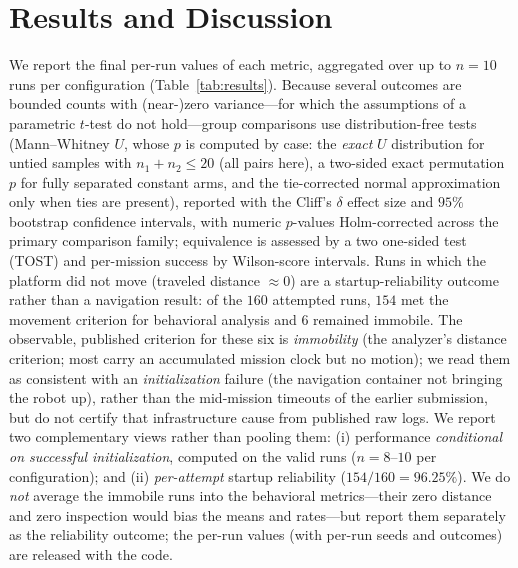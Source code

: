 \section{Results and Discussion}
\label{sec:results}
We report the final per-run values of each metric, aggregated over up to $n=10$
runs per configuration (Table~\ref{tab:results}). Because several outcomes are
bounded counts with (near-)zero variance---for which the assumptions of a
parametric $t$-test do not hold---group comparisons use distribution-free tests
(Mann--Whitney $U$, whose $p$ is computed by case: the \emph{exact} $U$
distribution for untied samples with $n_1+n_2\le20$ (all pairs here), a
two-sided exact permutation $p$ for fully separated constant arms, and the
tie-corrected normal approximation only when ties are present), reported with the
Cliff's $\delta$ effect size and $95\%$ bootstrap confidence intervals, with
numeric $p$-values Holm-corrected across the primary comparison family; equivalence is
assessed by a two one-sided test (TOST) and per-mission success by Wilson-score
intervals.
Runs in which the platform did not move
(traveled distance $\approx 0$) are a startup-reliability
outcome rather than a navigation result: of the $160$ attempted runs, $154$ met the
movement criterion for behavioral analysis and $6$ remained immobile. The
observable, published criterion for these six is \emph{immobility} (the analyzer's
distance criterion; most carry an accumulated mission clock but no motion); we read
them as consistent with an \emph{initialization} failure (the navigation container
not bringing the robot up), rather than the mid-mission timeouts of the earlier
submission, but do not certify that infrastructure cause from published raw logs. We report two complementary views rather than pooling them:
(i) performance \emph{conditional on successful initialization}, computed on the
valid runs ($n=8$--$10$ per configuration); and (ii) \emph{per-attempt} startup
reliability ($154/160=96.25\%$). We do \emph{not} average the immobile runs into
the behavioral metrics---their zero distance and zero inspection would bias the
means and rates---but report them separately as the reliability outcome; the
per-run values (with per-run seeds and outcomes) are released with the code.
